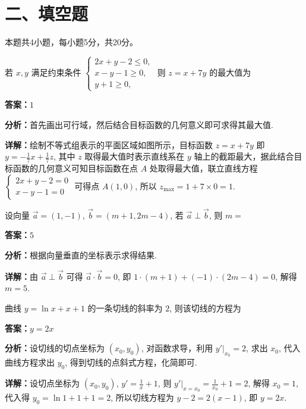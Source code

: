 \section*{二、填空题}
本题共4小题，每小题5分，共20分。

\begin{question}[points=5]
若 $x, y$ 满足约束条件 $\begin{cases} 2x + y - 2 \le 0, \\ x - y - 1 \ge 0, \\ y + 1 \ge 0, \end{cases}$ 则 $z = x + 7y$ 的最大值为
\fillin[{$1$}]
\begin{solution}
\textbf{答案：}$1$

\textbf{分析：}首先画出可行域，然后结合目标函数的几何意义即可求得其最大值.

\textbf{详解：}绘制不等式组表示的平面区域如图所示，目标函数 $z=x+7y$ 即 $y = -\frac{1}{7}x + \frac{1}{7}z$, 其中 $z$ 取得最大值时表示直线系在 $y$ 轴上的截距最大，据此结合目标函数的几何意义可知目标函数在点 $A$ 处取得最大值，联立直线方程 $\begin{cases} 2x+y-2=0 \\ x-y-1=0 \end{cases}$ 可得点 $A(1,0)$, 所以 $z_{\max}=1+7\times0=1$.
\end{solution}
\end{question}

\begin{question}[points=5]
设向量 $\vec{a} = (1, -1)$, $\vec{b} = (m+1, 2m-4)$, 若 $\vec{a} \perp \vec{b}$, 则 $m =$
\fillin[{$5$}]
\begin{solution}
\textbf{答案：}$5$

\textbf{分析：}根据向量垂直的坐标表示求得结果.

\textbf{详解：}由 $\vec{a} \perp \vec{b}$ 可得 $\vec{a} \cdot \vec{b} = 0$, 即 $1\cdot(m+1) + (-1)\cdot(2m-4) = 0$, 解得 $m=5$.
\end{solution}
\end{question}

\begin{question}[points=5]
曲线 $y = \ln x + x + 1$ 的一条切线的斜率为 $2$, 则该切线的方程为
\fillin[{$y = 2x$}]
\begin{solution}
\textbf{答案：}$y = 2x$

\textbf{分析：}设切线的切点坐标为 $(x_0, y_0)$, 对函数求导，利用 $y'|_{x_0} = 2$, 求出 $x_0$, 代入曲线方程求出 $y_0$, 得到切线的点斜式方程，化简即可.

\textbf{详解：}设切点坐标为 $(x_0, y_0)$, $y' = \frac{1}{x} + 1$, 则 $y'|_{x=x_0} = \frac{1}{x_0} + 1 = 2$, 解得 $x_0 = 1$, 代入得 $y_0 = \ln 1 + 1 + 1 = 2$, 所以切线方程为 $y - 2 = 2(x - 1)$, 即 $y = 2x$.
\end{solution}
\end{question}

